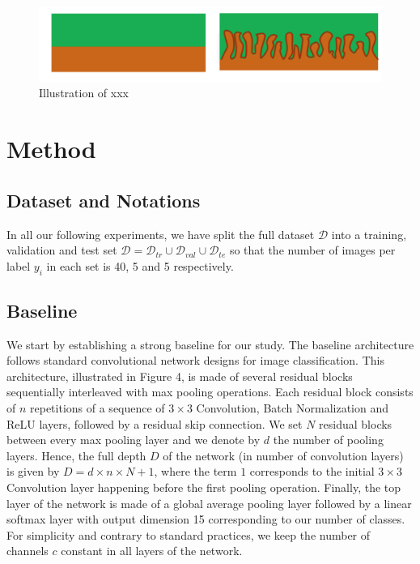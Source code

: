 \documentclass[10pt,twocolumn,letterpaper]{article}
\begin{document}
\begin{figure}[h]
	\centering
	\includegraphics[width=0.9\linewidth]{"./figures/Figure2"}
	\caption{
		Illustration of xxx
	}
\end{figure}

\section{Method}

\subsection{Dataset and Notations}


In all our following experiments, we have split the full dataset $\mathcal{D}$ into a training, validation and test set $\mathcal{D}=\mathcal{D}_{tr} \cup \mathcal{D}_{val} \cup \mathcal{D}_{te}$ so that the number of images per label $y_i$ in each set is 40, 5 and 5 respectively.

\subsection{Baseline}

We start by establishing a strong baseline for our study.
The baseline architecture follows standard convolutional network designs for image classification.
This architecture, illustrated in Figure 4, is made of several residual blocks 
sequentially interleaved with max pooling operations.
Each residual block consists of $n$ repetitions of a sequence of 
$3 \times 3$ Convolution, Batch Normalization and ReLU layers,
followed by a residual skip connection.
We set $N$ residual blocks between every max pooling layer
and we denote by $d$ the number of pooling layers.
Hence, the full depth $D$ of the network (in number of convolution layers) 
is given by $D=d \times n \times N +1$, where the term $1$ corresponds to the
initial $3 \times 3$ Convolution layer happening before the first pooling operation.
Finally, the top layer of the network is made of a global average pooling layer 
followed by a linear softmax layer with output dimension 15 corresponding to our number of classes.
For simplicity and contrary to standard practices, we keep the number of channels $c$ constant 
in all layers of the network.
\end{document}
